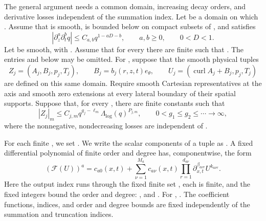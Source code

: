 %
The general argument needs a common domain, increasing decay orders, and derivative losses
independent of the summation index. Let  be a domain on which
. Assume that  is smooth, is
bounded below on compact subsets of , and satisfies
\begin{equation}
 |\partial_z^a\partial_t^bq|\leq C_{a,b}q^{1-aD-b},
 \qquad a,b\geq0,
 \qquad 0<D<1.
 \tag{5.28}\label{eq:5.28}
\end{equation}
Let  be smooth, with
. Assume that for every 
there are finite  such that
. The entries
 and  below may be omitted. For
, suppose that the smooth physical tuples
\begin{equation}
 Z_j=(A_j,B_j,p_j,T_j),
 \qquad B_j=b_j(r,z,t)e_\theta,
 \qquad U_j=(\operatorname{curl}A_j+B_j,p_j,T_j)
 \tag{5.29}\label{eq:5.29}
\end{equation}
are defined on this same domain. Require smooth Cartesian representatives at the axis and smooth
zero extensions at every lateral boundary of their spatial supports. Suppose that, for every
, there are finite constants
 such that
\begin{equation}
 |Z_j|_m\leq C_{j,m}q^{g_j-\ell_m}\Lambda_{\log}(q)^{P_{j,m}},
 \qquad 0<g_1\leq g_2\leq\cdots\longrightarrow\infty,
 \tag{5.30}\label{eq:5.30}
\end{equation}
where the nonnegative, nondecreasing losses  are independent of
.

For each finite , we set
. We write the scalar components of a tuple as
. A fixed differential polynomial of finite order and
degree has, componentwise, the form
\begin{equation}
 (\mathcal F(U))^a=c_{a0}(x,t)
 +\sum_{\nu=1}^{M_a}c_{a\nu}(x,t)
 \prod_{r=1}^{d_{a\nu}}\partial_{x,t}^{\beta_{a\nu r}}U^{k_{a\nu r}}.
 \tag{5.31}\label{eq:5.31}
\end{equation}
Here the output index runs through the fixed finite set ,
each  is finite, and the fixed integers
 bound the order and degree:
, and
. For
,
. The coefficient
functions, indices, and order and degree bounds  are fixed independently of
the summation and truncation indices.

